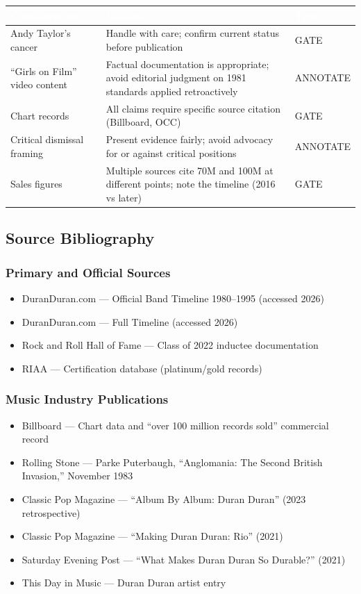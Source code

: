 \documentclass[11pt,letterpaper]{article}
\newcommand{\tableheader}[1]{\textbf{\sffamily\textcolor{white}{#1}}}
\begin{document}
\begin{center}
\begin{tabularx}{\textwidth}{L{4cm}XC{2.5cm}}
\toprule
{}
\tableheader{Consideration} & \tableheader{Guidance} & \tableheader{Type} \\
\midrule
Andy Taylor's cancer & Handle with care; confirm current status before publication & GATE \\
``Girls on Film'' video content & Factual documentation is appropriate; avoid editorial judgment on 1981 standards applied retroactively & ANNOTATE \\
Chart records & All claims require specific source citation (Billboard, OCC) & GATE \\
Critical dismissal framing & Present evidence fairly; avoid advocacy for or against critical positions & ANNOTATE \\
Sales figures & Multiple sources cite 70M and 100M at different points; note the timeline (2016 vs later) & GATE \\
\bottomrule
\end{tabularx}
\end{center}

\subsection{Source Bibliography}

\subsubsection{Primary and Official Sources}
\begin{itemize}
  \item DuranDuran.com --- Official Band Timeline 1980--1995 (accessed 2026)
  \item DuranDuran.com --- Full Timeline (accessed 2026)
  \item Rock and Roll Hall of Fame --- Class of 2022 inductee documentation
  \item RIAA --- Certification database (platinum/gold records)
\end{itemize}

\subsubsection{Music Industry Publications}
\begin{itemize}
  \item Billboard --- Chart data and ``over 100 million records sold'' commercial record
  \item Rolling Stone --- Parke Puterbaugh, ``Anglomania: The Second British Invasion,'' November 1983
  \item Classic Pop Magazine --- ``Album By Album: Duran Duran'' (2023 retrospective)
  \item Classic Pop Magazine --- ``Making Duran Duran: Rio'' (2021)
  \item Saturday Evening Post --- ``What Makes Duran Duran So Durable?'' (2021)
  \item This Day in Music --- Duran Duran artist entry
\end{itemize}
\end{document}
